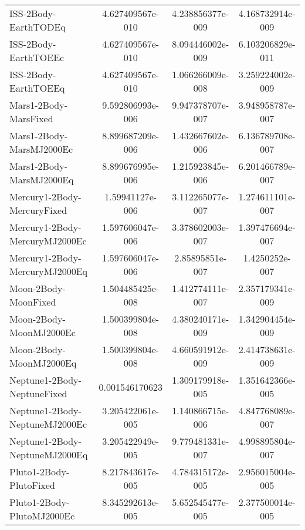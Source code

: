 \begin{table}[htbp!]
\begin{tabular}{lccc}
         ISS-2Body-EarthTODEq & 4.627409567e-010 & 4.238856377e-009 & 4.168732914e-009 \\
         ISS-2Body-EarthTOEEc & 4.627409567e-010 & 8.094446002e-009 & 6.103206829e-011 \\
         ISS-2Body-EarthTOEEq & 4.627409567e-010 & 1.066266009e-008 & 3.259224002e-009 \\
         Mars1-2Body-MarsFixed & 9.592806993e-006 & 9.947378707e-007 & 3.948958787e-007 \\
         Mars1-2Body-MarsMJ2000Ec & 8.899687209e-006 & 1.432667602e-006 & 6.136789708e-007 \\
         Mars1-2Body-MarsMJ2000Eq & 8.899676995e-006 & 1.215923845e-006 & 6.201466789e-007 \\
         Mercury1-2Body-MercuryFixed & 1.59941127e-006 & 3.112265077e-007 & 1.274611101e-007 \\
         Mercury1-2Body-MercuryMJ2000Ec & 1.597606047e-006 & 3.378602003e-007 & 1.397476694e-007 \\
         Mercury1-2Body-MercuryMJ2000Eq & 1.597606047e-006 & 2.85895851e-007 & 1.4250252e-007 \\
         Moon-2Body-MoonFixed & 1.504485425e-008 & 1.412774111e-007 & 2.357179341e-009 \\
         Moon-2Body-MoonMJ2000Ec & 1.500399804e-008 & 4.380240171e-009 & 1.342904454e-009 \\
         Moon-2Body-MoonMJ2000Eq & 1.500399804e-008 & 4.660591912e-009 & 2.414738631e-009 \\
         Neptune1-2Body-NeptuneFixed & 0.001546170623 & 1.309179918e-005 & 1.351642366e-005 \\
         Neptune1-2Body-NeptuneMJ2000Ec & 3.205422061e-005 & 1.140866715e-006 & 4.847768089e-007 \\
         Neptune1-2Body-NeptuneMJ2000Eq & 3.205422949e-005 & 9.779481331e-007 & 4.998895804e-007 \\
         Pluto1-2Body-PlutoFixed & 8.217843617e-005 & 4.784315172e-005 & 2.956015004e-005 \\
         Pluto1-2Body-PlutoMJ2000Ec & 8.345292613e-005 & 5.652545477e-005 & 2.377500014e-005 \\

\end{tabular}
\end{table}
